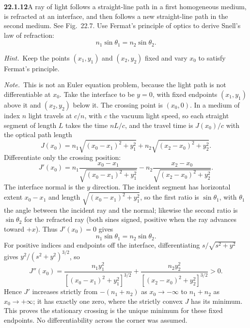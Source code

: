 \par\bigskip
\noindent\textbf{22.1.12}\quad A ray of light follows a
straight-line path in a first homogeneous medium, is refracted
at an interface, and then follows a new straight-line path in the
second medium. See Fig.~22.7. Use Fermat's principle of optics
to derive Snell's law of refraction:
\[
n_{1}\sin\theta_{1}=n_{2}\sin\theta_{2}.
\]
\par\emph{Hint.}~Keep the points $(x_{1},y_{1})$ and
$(x_{2},y_{2})$ fixed and vary $x_{0}$ to satisfy Fermat's
principle.
\par\emph{Note.}~This is not an Euler equation problem, because
the light path is not differentiable at $x_{0}$.
\solution
Take the interface to be $y=0$, with fixed endpoints
$(x_1,y_1)$ above it and $(x_2,y_2)$ below it. The crossing point
is $(x_0,0)$. In a medium of index $n$ light travels at $c/n$, with
$c$ the vacuum light speed, so each straight segment of length $L$ takes
the time $nL/c$, and the travel time is $J(x_0)/c$ with the optical
path length
\[
J(x_0)=n_1\sqrt{(x_0-x_1)^2+y_1^2}
+n_2\sqrt{(x_2-x_0)^2+y_2^2}.
\]
Differentiate only the crossing position:
\[
J'(x_0)=
n_1\frac{x_0-x_1}{\sqrt{(x_0-x_1)^2+y_1^2}}
-n_2\frac{x_2-x_0}{\sqrt{(x_2-x_0)^2+y_2^2}}.
\]
The interface normal is the $y$ direction. The incident segment has
horizontal extent $x_0-x_1$ and length $\sqrt{(x_0-x_1)^2+y_1^2}$, so
the first ratio is $\sin\theta_1$, with $\theta_1$ the angle between
the incident ray and the normal; likewise the second ratio is
$\sin\theta_2$ for the refracted ray (both sines signed, positive when
the ray advances toward $+x$). Thus $J'(x_0)=0$ gives
\[
\boxed{n_1\sin\theta_1=n_2\sin\theta_2}.
\]
For positive indices and endpoints off the interface,
differentiating $s/\sqrt{s^2+y^2}$ gives $y^2/(s^2+y^2)^{3/2}$, so
\[
J''(x_0)=
\frac{n_1y_1^2}{[(x_0-x_1)^2+y_1^2]^{3/2}}
+\frac{n_2y_2^2}{[(x_2-x_0)^2+y_2^2]^{3/2}}>0.
\]
Hence $J'$ increases strictly from $-(n_1+n_2)$ as $x_0\to-\infty$ to
$n_1+n_2$ as $x_0\to+\infty$; it has exactly one zero, where the
strictly convex $J$ has its minimum. This proves the stationary
crossing is the unique minimum for these fixed endpoints. No
differentiability across the corner was assumed.


